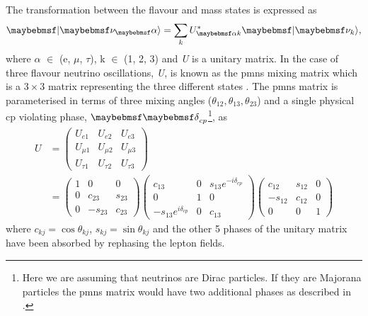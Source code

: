 The transformation between the flavour and mass states is expressed as
\begin{equation}\label{eqn:state transformation}
    \ket{\nu_\alpha} = \sum_k U^*_{\alpha k} \ket{\nu_k},
\end{equation}
where $\alpha$ $\in$ (e, $\mu$, $\tau$), k $\in$ (1, 2, 3) and \textit{U} is a unitary matrix. In the case of three flavour neutrino oscillations, \textit{U}, is known as the \gls{pmns} mixing matrix which is a $3 \times 3$ matrix representing the three different states \cite{Fundamentals_of_Neutrino_Physics_and_Astrophysics}. The \gls{pmns} matrix is parameterised in terms of three mixing angles ($\theta_{12}, \theta_{13}, \theta_{23}$) and a single physical \gls{cp} violating phase, \textit{$\Kronecker_{cp}$}\footnote{Here we are assuming that neutrinos are Dirac particles. If they are Majorana particles the \gls{pmns} matrix would have two additional phases as described in .}, as
\begin{equation}
\begin{split}
U &= 
\begin{pmatrix}
U_{e1} & U_{e2} & U_{e3} \\
U_{\mu1} & U_{\mu2} & U_{\mu3}  \\
U_{\tau1} & U_{\tau2} & U_{\tau3}
\end{pmatrix} \\
&=
\begin{pmatrix}
1 & 0 & 0 \\
0 & c_{23} & s_{23}  \\
0 & -s_{23} & c_{23}
\end{pmatrix}
\begin{pmatrix}
c_{13} & 0 & s_{13}e^{-i\delta_{cp}} \\
0 & 1 & 0  \\
-s_{13}e^{i\delta_{cp}} & 0 & c_{13}
\end{pmatrix}
\begin{pmatrix}
c_{12} & s_{12} & 0 \\
-s_{12} & c_{12} & 0  \\
0 & 0 & 1
\end{pmatrix}
\end{split}
\end{equation}
where $c_{kj} = \cos{\theta_{kj}}$, $s_{kj} = \sin{\theta_{kj}}$ and the other 5 phases of the unitary matrix have been absorbed by rephasing the lepton fields. 

